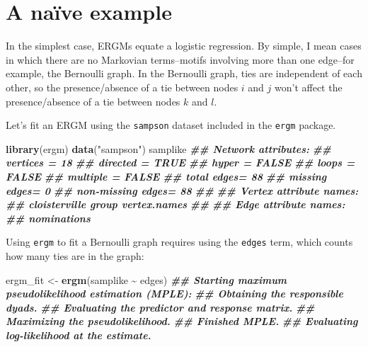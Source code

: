 \documentclass[
]{book}
\newenvironment{Shaded}{\begin{snugshade}}{\end{snugshade}}
\newcommand{\DocumentationTok}[1]{\textcolor[rgb]{0.56,0.35,0.01}{\textbf{\textit{#1}}}}
\newcommand{\FunctionTok}[1]{\textcolor[rgb]{0.13,0.29,0.53}{\textbf{#1}}}
\newcommand{\NormalTok}[1]{#1}
\newcommand{\OtherTok}[1]{\textcolor[rgb]{0.56,0.35,0.01}{#1}}
\newcommand{\SpecialCharTok}[1]{\textcolor[rgb]{0.81,0.36,0.00}{\textbf{#1}}}
\newcommand{\StringTok}[1]{\textcolor[rgb]{0.31,0.60,0.02}{#1}}
\begin{document}
\hypertarget{a-nauxefve-example}{%
\section{A naïve example}\label{a-nauxefve-example}}

In the simplest case, ERGMs equate a logistic regression. By simple, I mean cases in which there are no Markovian terms--motifs involving more than one edge--for example, the Bernoulli graph. In the Bernoulli graph, ties are independent of each other, so the presence/absence of a tie between nodes \(i\) and \(j\) won't affect the presence/absence of a tie between nodes \(k\) and \(l\).

Let's fit an ERGM using the \texttt{sampson} dataset included in the \texttt{ergm} package.

\begin{Shaded}
\begin{Highlighting}[]
\FunctionTok{library}\NormalTok{(ergm)}
\FunctionTok{data}\NormalTok{(}\StringTok{"sampson"}\NormalTok{)}
\NormalTok{samplike}
\DocumentationTok{\#\#  Network attributes:}
\DocumentationTok{\#\#   vertices = 18 }
\DocumentationTok{\#\#   directed = TRUE }
\DocumentationTok{\#\#   hyper = FALSE }
\DocumentationTok{\#\#   loops = FALSE }
\DocumentationTok{\#\#   multiple = FALSE }
\DocumentationTok{\#\#   total edges= 88 }
\DocumentationTok{\#\#     missing edges= 0 }
\DocumentationTok{\#\#     non{-}missing edges= 88 }
\DocumentationTok{\#\# }
\DocumentationTok{\#\#  Vertex attribute names: }
\DocumentationTok{\#\#     cloisterville group vertex.names }
\DocumentationTok{\#\# }
\DocumentationTok{\#\#  Edge attribute names: }
\DocumentationTok{\#\#     nominations}
\end{Highlighting}
\end{Shaded}

Using \texttt{ergm} to fit a Bernoulli graph requires using the \texttt{edges} term, which counts how many ties are in the graph:

\begin{Shaded}
\begin{Highlighting}[]
\NormalTok{ergm\_fit }\OtherTok{\textless{}{-}} \FunctionTok{ergm}\NormalTok{(samplike }\SpecialCharTok{\textasciitilde{}}\NormalTok{ edges)}
\DocumentationTok{\#\# Starting maximum pseudolikelihood estimation (MPLE):}
\DocumentationTok{\#\# Obtaining the responsible dyads.}
\DocumentationTok{\#\# Evaluating the predictor and response matrix.}
\DocumentationTok{\#\# Maximizing the pseudolikelihood.}
\DocumentationTok{\#\# Finished MPLE.}
\DocumentationTok{\#\# Evaluating log{-}likelihood at the estimate.}
\end{Highlighting}
\end{Shaded}
\end{document}
